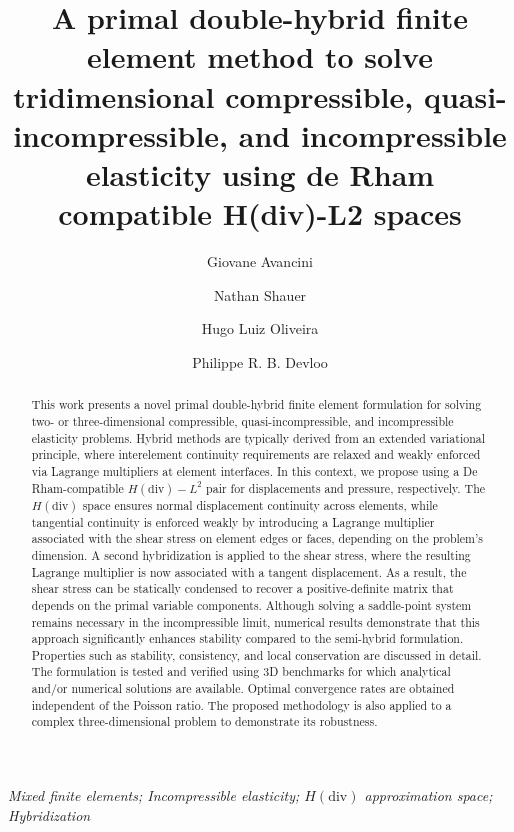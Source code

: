 \documentclass[english,11pt,3p,number,sort&compress]{elsarticle}
\begin{document}
\begin{frontmatter}{}

\title{A primal double-hybrid finite element method to solve tridimensional compressible, quasi-incompressible, and incompressible elasticity using de Rham compatible H(div)-L2 spaces}

\author[uni]{Giovane Avancini}


\author[uni]{Nathan Shauer}


\author[uni]{Hugo Luiz Oliveira}


\author[uni]{Philippe R. B. Devloo}



\address[uni]{Universidade Estadual de Campinas, R. Josiah Willard Gibbs 85 - Cidade Universitaria, Campinas SP, Brazil, CEP 13083-839}

\begin{abstract}
	This work presents a novel primal double-hybrid finite element formulation for solving two- or three-dimensional compressible, quasi-incompressible, and incompressible elasticity problems. Hybrid methods are typically derived from an extended variational principle, where interelement continuity requirements are relaxed and weakly enforced via Lagrange multipliers at element interfaces. In this context, we propose using a De Rham-compatible $H(\text{div})-L^2$ pair for displacements and pressure, respectively. The $H(\text{div})$ space ensures normal displacement continuity across elements, while tangential continuity is enforced weakly by introducing a Lagrange multiplier associated with the shear stress on element edges or faces, depending on the problem's dimension. A second hybridization is applied to the shear stress, where the resulting Lagrange multiplier is now associated with a tangent displacement. As a result, the shear stress can be statically condensed to recover a positive-definite matrix that depends on the primal variable components. Although solving a saddle-point system remains necessary in the incompressible limit, numerical results demonstrate that this approach significantly enhances stability compared to the semi-hybrid formulation. Properties such as stability, consistency, and local conservation are discussed in detail. The formulation is tested and verified using 3D benchmarks for which analytical and/or numerical solutions are available. Optimal convergence rates are obtained independent of the Poisson ratio. The proposed methodology is also applied to a complex three-dimensional problem to demonstrate its robustness.
\end{abstract}
\begin{keyword}
\textit{Mixed finite elements; Incompressible elasticity; $H\mathrm{(div)}$ approximation space; Hybridization}
\end{keyword}


\end{frontmatter}
\end{document}
